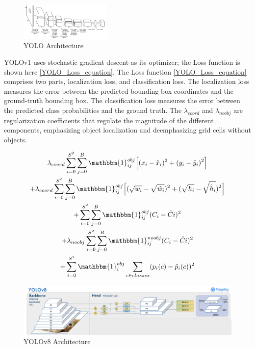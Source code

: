 \documentclass[10pt,twocolumn,letterpaper]{article}
\begin{document}
\begin{figure}[h]
    \centering
    \includegraphics[width=0.4\textwidth]{figures/YOLOv1 Architecture.png}
    \caption{YOLO Architecture \cite{YOLO_OG}}
    \label{fig:YOLOv1Architecture}
\end{figure}

YOLOv1 uses stochastic gradient descent as its optimizer; the Loss function is shown here \ref{YOLO_Loss_equation}. The Loss function \ref{YOLO_Loss_equation} comprises two parts, localization loss, and classification loss. The localization loss measures the error between the predicted bounding box coordinates and the ground-truth bounding box. The classification loss measures the error between the predicted class probabilities and the ground truth. The $\lambda_{coord}$ and $\lambda_{noobj}$ are regularization coefficients that regulate the magnitude of the different components, emphasizing object localization and deemphasizing grid cells without objects. 

\begin{multline} \label{YOLO_Loss_equation}
\lambda_{coord}\sum_{i=0}^{S^2}\sum_{j=0}^{B}\mathbbm{1}_{ij}^{obj}\Big[(x_i-\hat{x}_i)^2+(y_i-\hat{y}_i)^2\Big] \\ + \lambda_{coord}\sum_{i=0}^{S^2}\sum_{j=0}^{B}\mathbbm{1}_{ij}^{obj}\Big[(\sqrt{w_i}-\sqrt{\hat{w}_i})^2+(\sqrt{h_i}-\sqrt{\hat{h}_i})^2\Big]\\
+\sum_{i=0}^{S^2}\sum_{j=0}^{B}\mathbbm{1}_{ij}^{obj}(C_i-\hat{C}i)^2\\
+\lambda_{noobj}\sum_{i=0}^{S^2}\sum_{j=0}^{B}\mathbbm{1}_{ij}^{noobj}(C_i-\hat{C}i)^2\\
+\sum_{i=0}^{S^2}\mathbbm{1}_{i}^{obj}\sum_{c\in classes}(p_i(c)-\hat{p}_i(c))^2
\end{multline}

\begin{figure}[h]
    \centering
    \includegraphics[width=1.0\textwidth]{figures/YOLOv8_arch.png}
    \caption{YOLOv8 Architecture ~\cite{YOLOv8Website}}
    \label{fig:YOLOv8_arch}
\end{figure}
\end{document}
